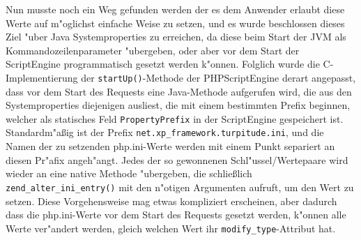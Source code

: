 Nun musste noch ein Weg gefunden werden der es dem Anwender erlaubt diese Werte auf m"oglichst einfache Weise zu setzen, und es wurde beschlossen dieses
Ziel "uber Java Systemproperties zu erreichen, da diese beim Start der JVM als Kommandozeilenparameter "ubergeben, oder aber vor dem Start der ScriptEngine 
programmatisch gesetzt werden k"onnen. Folglich wurde die C-Implementierung der \texttt{startUp()}-Methode der PHPScriptEngine derart angepasst, dass vor dem 
Start des Requests eine Java-Methode aufgerufen wird, die aus den Systemproperties diejenigen ausliest,  die mit einem bestimmten Prefix beginnen, welcher 
als statisches Feld \texttt{PropertyPrefix} in der ScriptEngine gespeichert ist.
Standardm"a\ss ig ist der Prefix \texttt{net.xp\_framework.turpitude.ini}, und die Namen der zu setzenden php.ini-Werte werden mit einem Punkt separiert an diesen
Pr"afix angeh"angt. Jedes der so gewonnenen Schl"ussel/Wertepaare wird wieder an eine native Methode "ubergeben, die schlie\ss lich \texttt{zend\_alter\_ini\_entry()}
mit den n"otigen Argumenten aufruft, um den Wert zu setzen. Diese Vorgehensweise mag etwas kompliziert erscheinen, aber dadurch dass die php.ini-Werte vor dem
Start des Requests gesetzt werden, k"onnen alle Werte ver"andert werden, gleich welchen Wert ihr \texttt{modify\_type}-Attribut hat.


